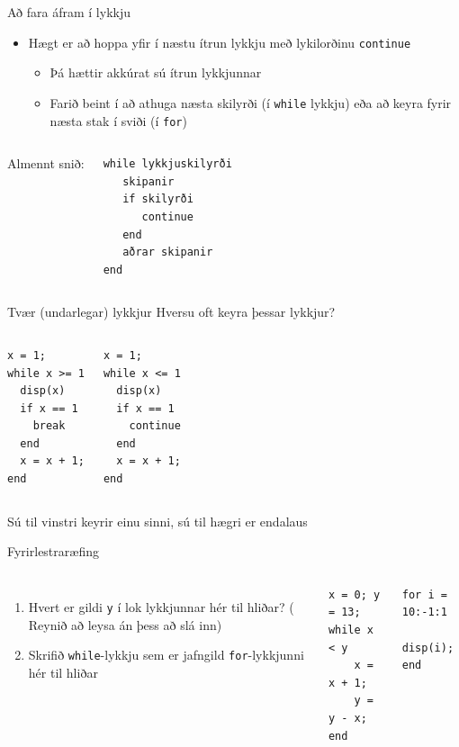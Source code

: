 \documentclass{beamer}
\begin{document}
\begin{frame}[fragile]{Að fara áfram í lykkju}
\vspace{1.5\baselineskip}
\begin{itemize}
 \item Hægt er að hoppa yfir í næstu ítrun lykkju með lykilorðinu \texttt{continue}
 \begin{itemize}
  \item Þá hættir akkúrat sú ítrun lykkjunnar
  \item Farið beint í að athuga næsta skilyrði (í \texttt{while} lykkju) eða að keyra fyrir næsta stak í sviði (í \texttt{for})
 \end{itemize}
\end{itemize}
\begin{columns}
Almennt snið:
\begin{verbatim}
while lykkjuskilyrði
   skipanir
   if skilyrði
      continue
   end
   aðrar skipanir
end
\end{verbatim}
\end{columns}
\end{frame}

\begin{frame}[fragile]{Tvær (undarlegar) lykkjur}
\vspace{\baselineskip}
Hversu oft keyra þessar lykkjur?
\begin{columns}
\begin{verbatim}
x = 1;
while x >= 1
  disp(x)
  if x == 1
    break
  end
  x = x + 1;
end
\end{verbatim}
\begin{verbatim}
x = 1;
while x <= 1
  disp(x)
  if x == 1
    continue
  end
  x = x + 1;
end
\end{verbatim}
\end{columns}
\pause Sú til vinstri keyrir einu sinni, sú til hægri er endalaus
\end{frame}


\begin{frame}[fragile]{Fyrirlestraræfing}
\begin{columns}
\begin{enumerate}
    \item Hvert er gildi \texttt{y} í lok lykkjunnar hér til hliðar? ( Reynið að leysa án þess að slá inn)
    \item Skrifið \texttt{while}-lykkju sem er jafngild \texttt{for}-lykkjunni hér til hliðar
\end{enumerate}
\begin{verbatim}
x = 0; y = 13;
while x < y
    x = x + 1;
    y = y - x;
end
\end{verbatim}
\begin{verbatim}
for i = 10:-1:1
    disp(i);
end
\end{verbatim}
\end{columns}
\end{frame}
\end{document}
